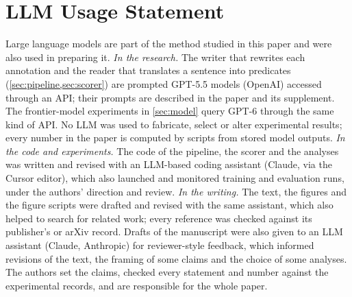 \section*{LLM Usage Statement}
Large language models are part of the method studied in this paper and were also used in preparing it.
\emph{In the research.} The writer that rewrites each annotation and the reader that translates a sentence into predicates (\cref{sec:pipeline,sec:scorer}) are prompted GPT-5.5 models (OpenAI) accessed through an API; their prompts are described in the paper and its supplement.
The frontier-model experiments in \cref{sec:model} query GPT-6 through the same kind of API.
No LLM was used to fabricate, select or alter experimental results; every number in the paper is computed by scripts from stored model outputs.
\emph{In the code and experiments.} The code of the pipeline, the scorer and the analyses was written and revised with an LLM-based coding assistant (Claude, via the Cursor editor), which also launched and monitored training and evaluation runs, under the authors' direction and review.
\emph{In the writing.} The text, the figures and the figure scripts were drafted and revised with the same assistant, which also helped to search for related work; every reference was checked against its publisher's or arXiv record. Drafts of the manuscript were also given to an LLM assistant (Claude, Anthropic) for reviewer-style feedback, which informed revisions of the text, the framing of some claims and the choice of some analyses. The authors set the claims, checked every statement and number against the experimental records, and are responsible for the whole paper.
